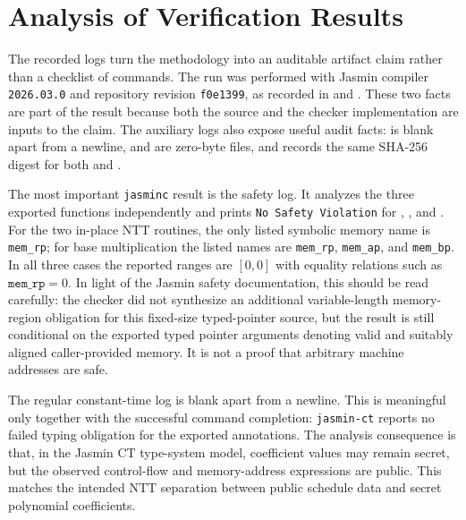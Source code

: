 \documentclass[10pt,twocolumn]{article}
\newcommand{\jasmin}{Jasmin}
\newcommand{\ct}{constant-time}
\begin{document}
\section{Analysis of Verification Results}

The recorded logs turn the methodology into an auditable artifact claim rather
than a checklist of commands.  The run was performed with \jasmin{} compiler
\texttt{2026.03.0} and repository revision \texttt{f0e1399}, as recorded in
 and .  These two facts are
part of the result because both the source and the checker implementation are
inputs to the claim.  The auxiliary logs also expose useful audit facts:
 is blank apart from a newline, 
and  are zero-byte files, and
 records the same SHA-256 digest for both
 and .

The most important \texttt{jasminc} result is the safety log.  It analyzes the
three exported functions independently and prints \texttt{No Safety Violation}
for , , and
.  For the two in-place NTT routines, the only listed
symbolic memory name is \texttt{mem\_rp}; for base multiplication the listed
names are \texttt{mem\_rp}, \texttt{mem\_ap}, and \texttt{mem\_bp}.  In all
three cases the reported ranges are \([0,0]\) with equality relations such as
\(\texttt{mem\_rp}=0\).  In light of the \jasmin{} safety documentation, this
should be read carefully: the checker did not synthesize an additional
variable-length memory-region obligation for this fixed-size typed-pointer
source, but the result is still conditional on the exported typed pointer
arguments denoting valid and suitably aligned caller-provided memory.  It is
not a proof that arbitrary machine addresses are safe.

The regular \ct{} log is blank apart from a newline.  This is meaningful only together with the
successful command completion: \texttt{jasmin-ct} reports no failed typing
obligation for the exported annotations.  The analysis consequence is that, in
the Jasmin CT type-system model, coefficient values may remain secret, but the
observed control-flow and memory-address expressions are public.  This matches
the intended NTT separation between public schedule data and secret polynomial
coefficients.
\end{document}
